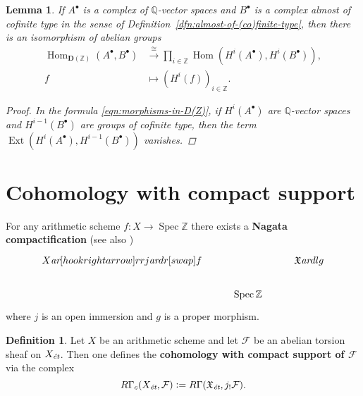 \documentclass[leqno,12pt]{article}
\theoremstyle{plain}
\newtheorem{lemma}[theorem]{\indent\sc Lemma}
\theoremstyle{definition}
\newtheorem{definition}[theorem]{\indent\sc Definition}
\DeclareMathOperator{\Spec}{Spec}
\DeclareMathOperator{\Hom}{Hom}
\DeclareMathOperator{\Ext}{Ext}
\newcommand{\QQ}{\mathbb{Q}}
\newcommand{\ZZ}{\mathbb{Z}}
\newcommand{\dfn}{\mathrel{\mathop:}=}
\newcommand{\ar}{\text{\it ar}}
\newcommand{\et}{\text{\it \'{e}t}}
\newcommand{\DZ}{{\mathbf{D} (\ZZ)}}
\begin{document}
\begin{lemma}
  \label{lemma:morphisms-in-DAb-between-cplx-of-Q-vs-and-almost-cofinite-type-cplx}
  If $A^\bullet$ is a complex of $\QQ$-vector spaces and $B^\bullet$ is a
  complex almost of cofinite type in the sense of
  Definition~{\rm\ref{dfn:almost-of-(co)finite-type}}, then there is an
  isomorphism of abelian groups
  \begin{align*}
    \Hom_\DZ (A^\bullet, B^\bullet) & \xrightarrow{\cong}
    \prod_{i\in \ZZ} \Hom (H^i (A^\bullet), H^i (B^\bullet)),\\
    f & \mapsto (H^i (f))_{i\in \ZZ}.
  \end{align*}

  \begin{proof}
    In the formula \eqref{eqn:morphisms-in-D(Z)}, if $H^i (A^\bullet)$ are
    $\QQ$-vector spaces and $H^{i-1} (B^\bullet)$ are groups of cofinite type,
    then the term $\Ext (H^i (A^\bullet), H^{i-1} (B^\bullet))$ vanishes.
  \end{proof}
\end{lemma}


\section{Cohomology with compact support}
\label{app:modified-cohomology-with-compact-support}

For any arithmetic scheme $f\colon X\to \Spec \ZZ$ there exists a
\textbf{Nagata compactification}
\cite{Conrad-Deligne-Nagata,Conrad-Deligne-Nagata-erratum}
(see also \cite[Expos\'{e}~XVII]{SGA4})
\[ \begin{tikzcd}
X \ar[hookrightarrow]{rr}{j}\ar{dr}[swap]{f} & & \mathfrak{X} \ar{dl}{g} \\
 & \Spec \ZZ
\end{tikzcd} \]
where $j$ is an open immersion and $g$ is a proper morphism.

\begin{definition}
  Let $X$ be an arithmetic scheme and let $\mathcal{F}$ be an abelian torsion
  sheaf on $X_\et$. Then one defines the
  \textbf{cohomology with compact support of $\mathcal{F}$} via the complex
  \begin{equation}
    \label{eqn:RGammac-via-extension-by-zero}
    R\Gamma_c (X_\et, \mathcal{F}) \dfn
    R\Gamma (\mathfrak{X}_\text{\it \'et}, j_! \mathcal{F}).
  \end{equation}
\end{definition}
\end{document}
